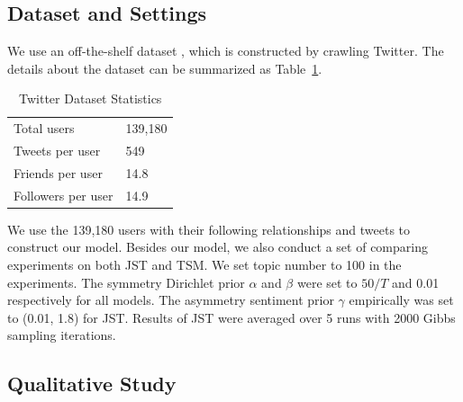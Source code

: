 \documentclass[runningheads,a4paper]{llncs}
\begin{document}
\subsection{Dataset and Settings}

We use an off-the-shelf dataset \cite{DBLP:conf/kdd/LiWDWC12}, which is constructed by crawling Twitter. The details about the dataset can be summarized as Table~\ref{tab1}.   
\begin{table}
\centering
\caption{Twitter Dataset Statistics}
\label{tab1}
\begin{tabular}{ll}
\hline
Total users  & 139,180 \\
Tweets per user & 549 \\
Friends per user & 14.8 \\
Followers per user & 14.9  \\
\hline
\end{tabular}
\end{table}
We use the 139,180 users with their following relationships and tweets to construct our model. 
Besides our model, we also conduct a set of comparing experiments on both JST and TSM.  We set topic number to 100 in the experiments. The symmetry Dirichlet prior $ \alpha $ and $ \beta $ were set to $ 50/T $ and 0.01 respectively for all models. The asymmetry sentiment prior $ \gamma $ empirically was set to (0.01, 1.8) for JST. Results of JST were averaged over 5 runs with 2000 Gibbs sampling iterations.

\subsection{Qualitative Study}
\end{document}
